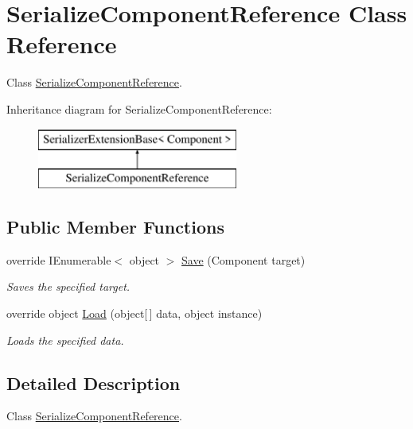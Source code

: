 \hypertarget{class_serialize_component_reference}{}\section{Serialize\+Component\+Reference Class Reference}
\label{class_serialize_component_reference}


Class \hyperlink{class_serialize_component_reference}{Serialize\+Component\+Reference}.  


Inheritance diagram for Serialize\+Component\+Reference\+:\begin{figure}[H]
\begin{center}
\leavevmode
\includegraphics[height=2.000000cm]{class_serialize_component_reference}
\end{center}
\end{figure}
\subsection*{Public Member Functions}
\begin{DoxyCompactItemize}
\item 
override I\+Enumerable$<$ object $>$ \hyperlink{class_serialize_component_reference_af5ca5949f4c6d435bf8af4bb3718982c}{Save} (Component target)
\begin{DoxyCompactList}\small\item\em Saves the specified target. \end{DoxyCompactList}\item 
override object \hyperlink{class_serialize_component_reference_aee8108ae073c2c74d95244f2bd10cc8c}{Load} (object\mbox{[}$\,$\mbox{]} data, object instance)
\begin{DoxyCompactList}\small\item\em Loads the specified data. \end{DoxyCompactList}\end{DoxyCompactItemize}


\subsection{Detailed Description}
Class \hyperlink{class_serialize_component_reference}{Serialize\+Component\+Reference}. 



